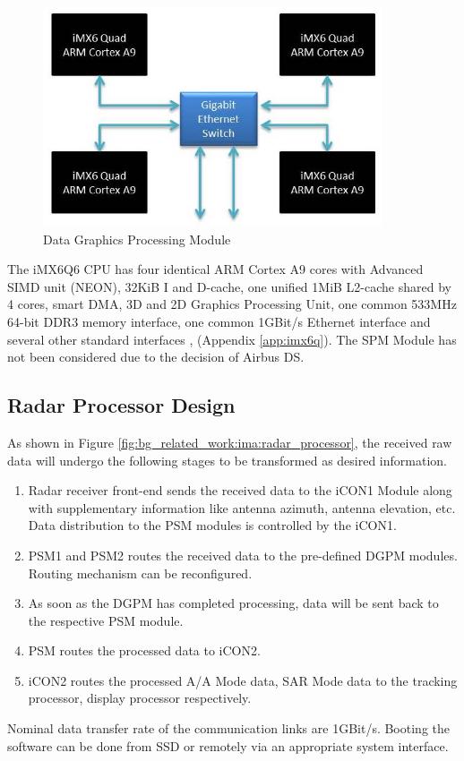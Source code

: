 \begin{figure}[h!]
	\centering
	\includegraphics[width=100mm]{figures/dgpm}
	\caption{Data Graphics Processing Module \cite{fcas}}
	\label{fig:bg_related_work:ima:dgpm}
\end{figure}

The iMX6Q6 CPU has four identical ARM Cortex A9 cores with Advanced SIMD unit (NEON), 32KiB I and D-cache, one unified 1MiB L2-cache shared by 4 cores, smart DMA, 3D and 2D Graphics Processing Unit, one common 533MHz 64-bit DDR3 memory interface, one common 1GBit/s Ethernet interface and several other standard interfaces \cite{imx_spec}, (Appendix \ref{app:imx6q}). The SPM Module has not been considered due to the decision of Airbus DS.

\subsection{Radar Processor Design}
\label{ss:bg_related_work:togther}
As shown in Figure \ref{fig:bg_related_work:ima:radar_processor}, the received raw data will undergo the following stages to be transformed as desired information.
\begin{enumerate}
	\item Radar receiver front-end sends the received data to the iCON1 Module along with supplementary information like antenna azimuth, antenna elevation, etc. Data distribution to the PSM modules is controlled by the iCON1. 

	\item PSM1 and PSM2 routes the received data to the pre-defined DGPM modules. Routing mechanism can be reconfigured.

	\item As soon as the DGPM has completed processing, data will be sent back to the respective PSM module.

	\item PSM routes the processed data to iCON2. 

	\item iCON2 routes the processed A/A Mode data, SAR Mode data to the tracking processor, display processor respectively. 
\end{enumerate}
Nominal data transfer rate of the communication links are 1GBit/s. Booting the software can be done from SSD or remotely via an appropriate system interface.

